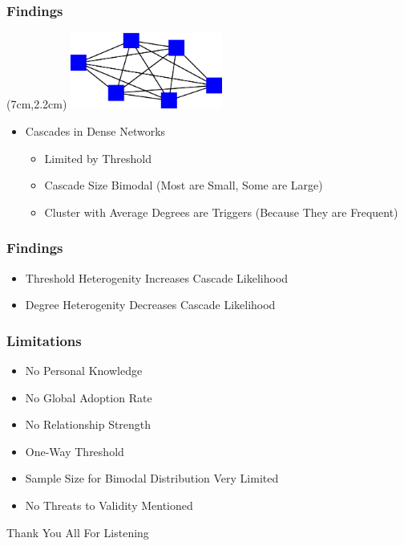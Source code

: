\documentclass[slidestop,usenames,dvipsnames]{beamer}
\newcommand{\fitem}{\pause\vfill\item}
\newcommand{\gitem}{\vfill\item}
\begin{document}
\begin{frame}
    \frametitle{Findings}
    \begin{textblock*}{5cm}(7cm,2.2cm)
        \includegraphics[width=5cm]{img/dense}
    \end{textblock*}
    \begin{itemize}
        \gitem Cascades in Dense Networks
        \begin{itemize}
            \fitem Limited by Threshold
            \fitem Cascade Size Bimodal (Most are Small, Some are Large)
            \fitem Cluster with Average Degrees are Triggers (Because They are Frequent)
        \end{itemize}
    \end{itemize}
    \vfill
\end{frame}

\begin{frame}
  \frametitle{Findings}
  \begin{itemize}
    \fitem Threshold Heterogenity Increases Cascade Likelihood
    \fitem Degree Heterogenity Decreases Cascade Likelihood
  \end{itemize}
  \vfill
\end{frame}

\begin{frame}
    \frametitle{Limitations}
    \begin{itemize}
        \fitem No Personal Knowledge
        \fitem No Global Adoption Rate
        \fitem No Relationship Strength
        \fitem One-Way Threshold
        \fitem Sample Size for Bimodal Distribution Very Limited
        \fitem No Threats to Validity Mentioned
    \end{itemize}
    \vfill
\end{frame}




\begin{frame}
    \vfill
    \begin{center}
        {\Huge Thank You All For Listening}\
    \end{center}
\end{frame}
\end{document}
